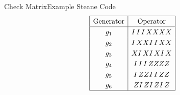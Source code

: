 \begin{frame}{Check Matrix}{Example Steane Code}
\[        {
            \renewcommand{\arraystretch}{1.25}
            \begin{array}{|c|c|}
                \hline
                \text{Generator} & \text{Operator} \\
                \hline
                g_1              & I\,I\,I\,XXXX   \\
                g_2              & I\,XXI\,I\,XX   \\
                g_3              & XI\,XI\,XI\,X   \\
                g_4              & I\,I\,I\,ZZZZ   \\
                g_5              & I\,ZZI\,I\,ZZ   \\
                g_6              & ZI\,ZI\,ZI\,Z   \\
                \hline
            \end{array}
        }
    \]

    \vspace*{4mm}

\end{frame}